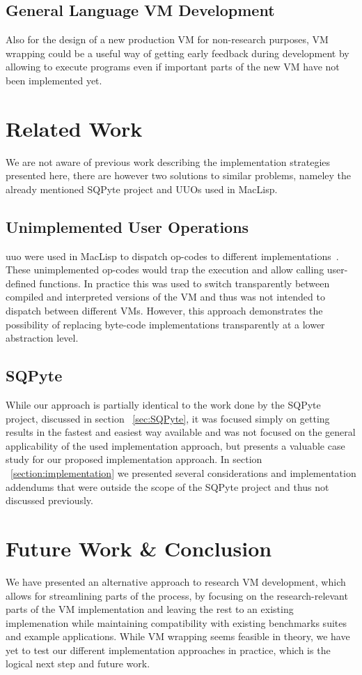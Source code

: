 \documentclass[preprint, nonatbib]{sigplanconf}
\begin{document}
\subsection{General Language VM Development}
Also for the design of a new production VM for non-research purposes, VM wrapping could be a useful way of getting early feedback during development by allowing to execute programs even if important parts of the new VM have not been implemented yet. 


\section{Related Work}
We are not aware of previous work describing the implementation strategies presented here, there are however two solutions to similar problems, nameley the already mentioned SQPyte project and UUOs used in MacLisp.

\subsection{Unimplemented User Operations}
\gls{uuo} were used in MacLisp to dispatch op-codes to different implementations~\cite{gabriel1985performance}. These unimplemented op-codes would trap the execution and allow calling user-defined functions. In practice this was used to switch transparently between compiled and interpreted versions of the VM and thus was not intended to dispatch between different VMs. However, this approach demonstrates the possibility of replacing byte-code implementations transparently at a lower abstraction level.

\subsection{SQPyte}
While our approach is partially identical to the work done by the SQPyte project, discussed in section ~\ref{sec:SQPyte}, it was focused simply on getting results in the fastest and easiest way available and was not focused on the general applicability of the used implementation approach, but presents a valuable case study for our proposed implementation approach. In section ~\ref{section:implementation} we presented several considerations and implementation addendums that were outside the scope of the SQPyte project and thus not discussed previously.



\section{Future Work \& Conclusion}
\label{sec:futureWork}
We have presented an alternative approach to research VM development, which allows for streamlining parts of the process, by focusing on the research-relevant parts of the VM implementation and leaving the rest to an existing implemenation while maintaining compatibility with existing benchmarks suites and example applications.
While VM wrapping seems feasible in theory, we have yet to test our different implementation approaches in practice, which is the logical next step and future work.
\end{document}
